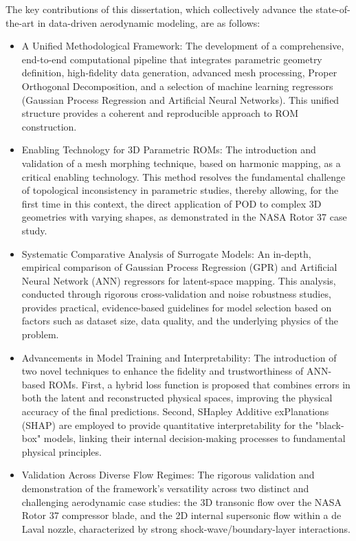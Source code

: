 The key contributions of this dissertation, which collectively advance the state-of-the-art in data-driven aerodynamic modeling, are as follows:

\begin{itemize}
    \item A Unified Methodological Framework: The development of a comprehensive, end-to-end computational pipeline that integrates parametric geometry definition, high-fidelity data generation, advanced mesh processing, Proper Orthogonal Decomposition, and a selection of machine learning regressors (Gaussian Process Regression and Artificial Neural Networks). This unified structure provides a coherent and reproducible approach to ROM construction.

    \item Enabling Technology for 3D Parametric ROMs: The introduction and validation of a mesh morphing technique, based on harmonic mapping, as a critical enabling technology. This method resolves the fundamental challenge of topological inconsistency in parametric studies, thereby allowing, for the first time in this context, the direct application of POD to complex 3D geometries with varying shapes, as demonstrated in the NASA Rotor 37 case study. 

    \item Systematic Comparative Analysis of Surrogate Models: An in-depth, empirical comparison of Gaussian Process Regression (GPR) and Artificial Neural Network (ANN) regressors for latent-space mapping. This analysis, conducted through rigorous cross-validation and noise robustness studies, provides practical, evidence-based guidelines for model selection based on factors such as dataset size, data quality, and the underlying physics of the problem.  

    \item Advancements in Model Training and Interpretability: The introduction of two novel techniques to enhance the fidelity and trustworthiness of ANN-based ROMs. First, a hybrid loss function is proposed that combines errors in both the latent and reconstructed physical spaces, improving the physical accuracy of the final predictions. Second, SHapley Additive exPlanations (SHAP) are employed to provide quantitative interpretability for the "black-box" models, linking their internal decision-making processes to fundamental physical principles. 

    \item Validation Across Diverse Flow Regimes: The rigorous validation and demonstration of the framework's versatility across two distinct and challenging aerodynamic case studies: the 3D transonic flow over the NASA Rotor 37 compressor blade, and the 2D internal supersonic flow within a de Laval nozzle, characterized by strong shock-wave/boundary-layer interactions.
\end{itemize}


